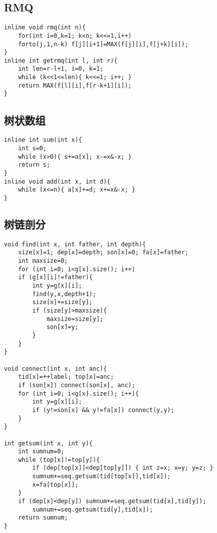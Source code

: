 \documentclass{article}
\begin{document}
\subsection{RMQ}
\begin{lstlisting}
inline void rmq(int n){
	for(int i=0,k=1; k<n; k<<=1,i++)
	forto(j,1,n-k) f[j][i+1]=MAX(f[j][i],f[j+k][i]);
}
inline int getrmq(int l, int r){
	int len=r-l+1, i=0, k=1;
	while (k<<1<=len){ k<<=1; i++; }
	return MAX(f[l][i],f[r-k+1][i]);
}
\end{lstlisting}

\subsection{树状数组}
\begin{lstlisting}
inline int sum(int x){
	int s=0;
	while (x>0){ s+=a[x]; x-=x&-x; }
	return s;
}
inline void add(int x, int d){
	while (x<=n){ a[x]+=d; x+=x&-x; }
}
\end{lstlisting}

\subsection{树链剖分}
\begin{lstlisting}
void find(int x, int father, int depth){
    size[x]=1; dep[x]=depth; son[x]=0; fa[x]=father;
    int maxsize=0;
    for (int i=0; i<g[x].size(); i++)
    if (g[x][i]!=father){
        int y=g[x][i];
        find(y,x,depth+1);
        size[x]+=size[y];
        if (size[y]>maxsize){
            maxsize=size[y];
            son[x]=y;
        }
    }
}

void connect(int x, int anc){
    tid[x]=++label; top[x]=anc;
    if (son[x]) connect(son[x], anc);
    for (int i=0; i<g[x].size(); i++){
        int y=g[x][i];
        if (y!=son[x] && y!=fa[x]) connect(y,y);
    }
}

int getsum(int x, int y){
    int sumnum=0;
    while (top[x]!=top[y]){
        if (dep[top[x]]<dep[top[y]]) { int z=x; x=y; y=z; }
        sumnum+=seq.getsum(tid[top[x]],tid[x]);
        x=fa[top[x]];
    }
    if (dep[x]<dep[y]) sumnum+=seq.getsum(tid[x],tid[y]);
        sumnum+=seq.getsum(tid[y],tid[x]);
    return sumnum;
}
\end{lstlisting}
\end{document}
